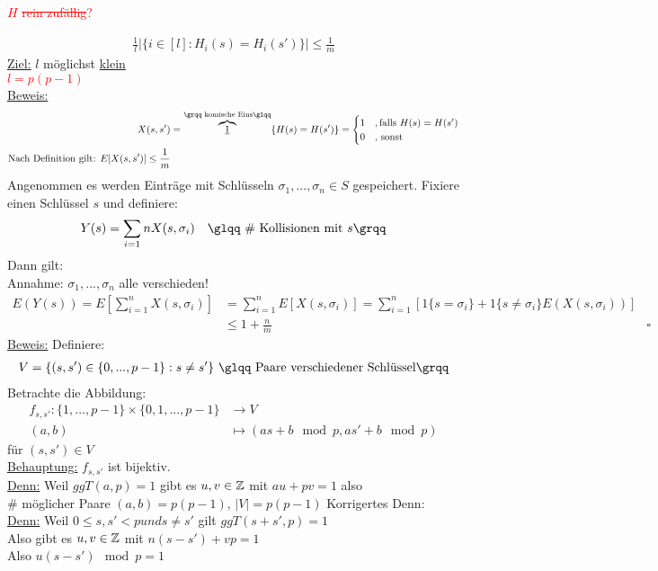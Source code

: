 \textcolor{red}{$H$ \grqq \sout{rein zufällig}\glqq?}

\begin{align*}
    \frac{1}{l} \left| \{i \in [l]: H_i(s) = H_i(s')\}\right| \leq \frac{1}{m}
\end{align*}
\underline{Ziel:} $l$ möglichst \underline{klein}\\
\textcolor{red}{$l = p(p-1)$}\\
\underline{Beweis:}
\begin{align*}
    X(s, s') &= \overbrace{\underline{1}}^{\text{\grqq komische Eins\glqq}} \{ H(s) = H(s')\} = \begin{cases}
    1 & , \text{falls } H(s) = H(s')\\
    0 & \text{, sonst}
    \end{cases}\\
    \text{Nach Definition gilt: } E[X(s, s')] \leq \frac{1}{m}\\
\end{align*}
Angenommen es werden Einträge mit Schlüsseln $\sigma_1, ..., \sigma_n \in S$ gespeichert. Fixiere einen Schlüssel $s$ und definiere:
\begin{align*}
    Y(s) &= \sum_{i = 1}{n} X(s, \sigma_i) & \text{\glqq \# Kollisionen mit $s$\grqq} 
\end{align*}
Dann gilt:\\
Annahme: $\sigma_1, ..., \sigma_n$ alle verschieden!
\begin{align*}
    E(Y(s)) = E\left[\sum_{i = 1}^{n} X(s, \sigma_i) \right] &= \sum_{i = 1}^{n} E \left[X(s, \sigma_i)\right] = \sum_{i = 1}^{n} \left[1 \{s = \sigma_i\} + 1 \{s \neq \sigma_i\} E(X(s, \sigma_i))\right]\\
    &\leq 1 + \frac{n}{m} & \square
\end{align*}
\underline{Beweis:}
Definiere:
\begin{align*}
    V = \{ (s, s') \in \{0, ..., p-1\}: s \neq s'\} \text{ \glqq Paare verschiedener Schlüssel\grqq}
\end{align*}
Betrachte die Abbildung:
\begin{align*}
    f_{s, s'}: \{1, ..., p-1\} \times \{0, 1, ..., p-1\} &\rightarrow V\\
    (a, b) &\mapsto (as + b \mod p, as' + b \mod p)
\end{align*}
für $(s, s') \in V$\\
\underline{Behauptung:} $f_{s, s'}$ ist bijektiv.\\
\underline{Denn:} Weil $ggT(a, p) = 1$ gibt es $u, v \in \mathbb Z$ mit $au + pv = 1$ also  \\
$\#$ möglicher Paare $(a, b) = p(p-1)$, $|V| = p(p-1)$
Korrigertes Denn:\\
\underline{Denn:} Weil $0 \leq s, s' < p und s \neq s'$ gilt $ggT(s + s', p) = 1$\\
Also gibt es $u, v \in \mathbb Z$ mit $n(s - s') + vp = 1$\\
Also $u(s- s') \mod p = 1$

